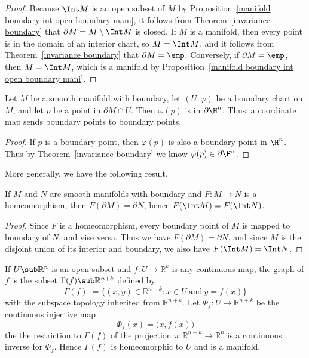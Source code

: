 \begin{proof}
Because $\Int M$ is an open subset of $M$ by Proposition~\ref{manifold boundary int open boundary mani}, it follows from Theorem~\ref{invariance boundary} that $\partial M=M\setminus\Int M$ is closed. If $M$ is a manifold, then every point is in the domain of an interior chart, so $M=\Int M$, and it follows from Theorem~\ref{invariance boundary} that $\partial M=\emp$. Conversely, if $\partial M=\emp$, then $M=\Int M$, which is a manifold by Proposition~\ref{manifold boundary int open boundary mani}.
\end{proof}
\begin{corollary}
Let $M$ be a smooth manifold with boundary, let $(U,\varphi)$ be a boundary chart
on $M$, and let $p$ be a point in $\partial M\cap U$. Then $\varphi(p)$ is in $\partial\H^n$. Thus, a coordinate map sends boundary points to boundary points.
\end{corollary}
\begin{proof}
If $p$ is a boundary point, then $\varphi(p)$ is also a boundary point in $\H^n$. Thus by Theorem~\ref{invariance boundary} we know $\varphi(p)\in\partial\H^n$.
\end{proof}
More generally, we have the following result.
\begin{theorem}\label{homeomorphism invariance boundary}
If $M$ and $N$ are smooth manifolds with boundary and $F:M\to N$ is a homeomorphism, then $F(\partial M)=\partial N$, hence $F(\Int M)=F(\Int N)$.
\end{theorem}
\begin{proof}
Since $F$ is a homeomorphism, every boundary point of $M$ is mapped to boundary of $N$, and vise versa. Thus we have $F(\partial M)=\partial N$, and since $M$ is the disjoint union of its interior and boundary, we also have $F(\Int M)=\Int N$.
\end{proof}
\begin{example}\label{Graph mani}
If $U\sub\mathbb{R}^n$ is an open subset and $f:U\to\mathbb{R}^k$ is any continuous map, the graph of $f$ is the subset $\Gamma(f)\sub\mathbb{R}^{n+k}$ defined by
\[\Gamma(f):=\{(x,y)\in\mathbb{R}^{n+k}:x\in U\ \text{and}\ y=f(x)\}\]
with the subspace topology inherited from $\mathbb{R}^{n+k}$. Let $\varPhi_f:U\to\mathbb{R}^{n+k}$ be the continuous injective map
\[\varPhi_f(x)=\big(x,f(x)\big)\]
the the restriction to $\Gamma(f)$ of the projection $\pi:\mathbb{R}^{n+k}\to\mathbb{R}^{n}$ is a continuous inverse for $\Phi_f$. Hence $\Gamma(f)$ is homeomorphic to $U$ and is a manifold.
\end{example}
